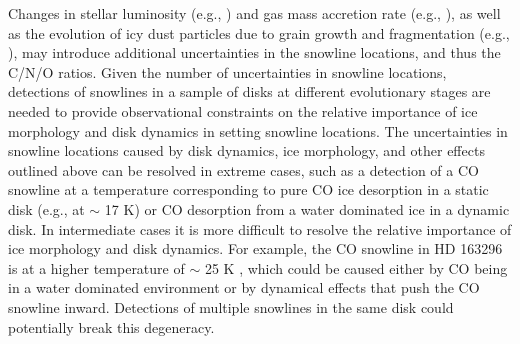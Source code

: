 \documentclass[apj]{emulateapj}
\begin{document}
Changes in stellar luminosity (e.g., \citealt{kennedy06}) and gas mass accretion rate (e.g., \citealt{chambers09}), as well as the evolution of icy dust particles due to grain growth and fragmentation (e.g., \citealt{birnstiel12}), may introduce additional uncertainties in the snowline locations, and thus the C/N/O ratios. Given the number of uncertainties in snowline locations, detections of snowlines in a sample of disks at different evolutionary stages are needed to provide observational constraints on the relative importance of ice morphology and disk dynamics in setting snowline locations. The uncertainties in snowline locations caused by disk dynamics, ice morphology, and other effects outlined above can be resolved in extreme cases, such as a detection of a CO snowline at a temperature corresponding to pure CO ice desorption in a static disk (e.g., \citealt{qi13} at $\sim$ 17 K) or CO desorption from a water dominated ice in a dynamic disk. In intermediate cases it is more difficult to resolve the relative importance of ice morphology and disk dynamics. For example, the CO snowline in HD 163296 is at a higher temperature of $\sim$ 25 K \citep{qi15}, which could be caused either by CO being in a water dominated environment or by dynamical effects that push the CO snowline inward. Detections of multiple snowlines in the same disk could potentially break this degeneracy. %

\end{document}
